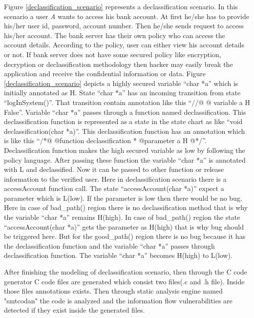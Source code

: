  Figure \ref{declassification_scenario} represents a declassification scenario. In this scenario a user \emph{A} wants to access his bank account. At first he/she has to provide his/her user id, password, account number. Then he/she sends request to access his/her account. The bank server has their own policy who can access the account details. According to the policy, user can either view his account details or not. If bank server does not have some secured policy like encryption, decryption or declassification methodology then hacker may easily break the application and receive the confidential information or data. Figure \ref{declassification_scenario} depicts a highly secured variable \enquote{char *a} which is initially annotated as H. State \enquote{char *a} has an incoming transition from state \enquote{logInSystem()}. That transition contain annotation like this \enquote{//@ @ variable a H False}. Variable \enquote{char *a} passes through a function named declassification. This declassification function is represented as a state in the state chart as like \enquote{void declassification(char *a)}. This declassification function has an annotation which is like this \enquote{/*@ @function declassification * @parameter a H @*/}. Declassification function makes the high secured variable as low by following the policy language. After passing these function the variable \enquote{char *a} is annotated with L and declassified. Now it can be passed to other function or release information to the verified user. Here in declassification scenario there is a accessAccount function call. The state \enquote{accessAccount(char *a)} expect a parameter which is L(low). If the parameter is low then there would be no bug. Here in case of bad\_path() region there is no declassification method that is why the variable \enquote{char *a} remains H(high). In case of bad\_path() region the state \enquote{accessAccount(char *a)} gets the parameter as H(high) that is why bug should be triggered here. But for the good\_path() region there is no bug because it has the declassification function and the variable \enquote{char *a} passes through declassification function. The variable \enquote{char *a} becomes H(high) to L(low).
 
 After finishing the modeling of declassification scenario, then through the C code generator C code files are generated which consist two files(.c and .h file). Inside those files annotations exists. Then through static analysis engine named "smtcodan" the code is analyzed and the information flow vulnerabilities are  detected if they exist inside the generated files.
 
